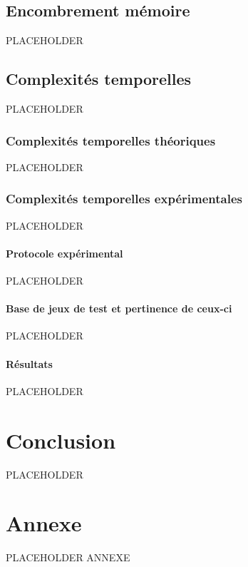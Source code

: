 \documentclass{article}
\begin{document}
    \subsection{Encombrement mémoire}
    
    PLACEHOLDER
    
    \subsection{Complexités temporelles}

    PLACEHOLDER
    
        \subsubsection{Complexités temporelles théoriques}
        
        PLACEHOLDER
        
        \subsubsection{Complexités temporelles expérimentales}
        
        PLACEHOLDER
        
            \paragraph{Protocole expérimental}
            
            PLACEHOLDER
        
            \paragraph{Base de jeux de test et pertinence de ceux-ci}
            
            PLACEHOLDER
            
            \paragraph{Résultats}
            
            PLACEHOLDER

\section{Conclusion}

PLACEHOLDER

\newpage
\appendix

\section*{Annexe}

PLACEHOLDER ANNEXE

\newpage
\tableofcontents
\end{document}
